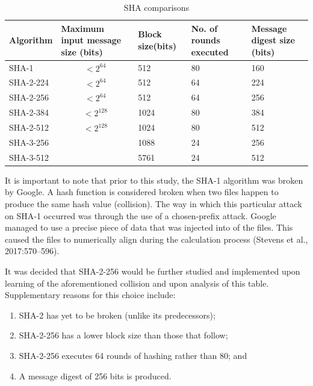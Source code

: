    
    \begin{table}[h]
    \caption{SHA comparisons}
    \centering
     \begin{tabular}{|p{} | p{}| p{}| p{}| p{}|} 
     \hline
    	\textbf{Algorithm} & \textbf{Maximum input message size (bits)} & \textbf{Block size(bits)} & \textbf{No. of rounds executed} & \textbf{Message digest size (bits)} \\ [1ex] 
     \hline\hline
     SHA-1 & \[ <2^{64}\] & 512 & 80 & 160 \\[1ex]
     \hline
     SHA-2-224 & \[ <2^{64}\] & 512 & 64 & 224 \\[1ex]
     \hline
     SHA-2-256 & \[ <2^{64}\] & 512 & 64 & 256 \\[1ex]
     \hline           
     SHA-2-384 & \[ <2^{128}\] & 1024 & 80 & 384 \\[1ex]
     \hline      
     SHA-2-512 & \[ <2^{128}\] & 1024 & 80 & 512 \\[1ex]
     \hline
     SHA-3-256 & \centering{Unlimited} & 1088 & 24 & 256 \\[1ex] 
     \hline
     SHA-3-512 & \centering{Unlimited} & 5761 & 24 & 512 \\[1ex]
     \hline
     \end{tabular}
     \label{table: SHA comparisons}
    \end{table}
    
    It is important to note that prior to this study, the SHA-1 algorithm was broken by Google. A hash function is considered broken when two files happen to produce the same hash value (collision). The way in which this particular attack on SHA-1 occurred was through the use of a chosen-prefix attack. Google managed to use a precise piece of data that was injected into of the files. This caused the files to numerically align during the calculation process (Stevens et al., 2017:570–596).
    
    It was decided that SHA-2-256 would be further studied and implemented upon learning of the aforementioned collision and upon analysis of this table. Supplementary reasons for this choice include:
    
        \begin{enumerate}[label=\roman*.]
            
            \item SHA-2 has yet to be broken (unlike its predecessors);
            \item SHA-2-256 has a lower block size than those that follow; \item SHA-2-256 executes 64 rounds of hashing rather than 80; and
            \item A message digest of 256 bits is produced.

        \end{enumerate}
    

